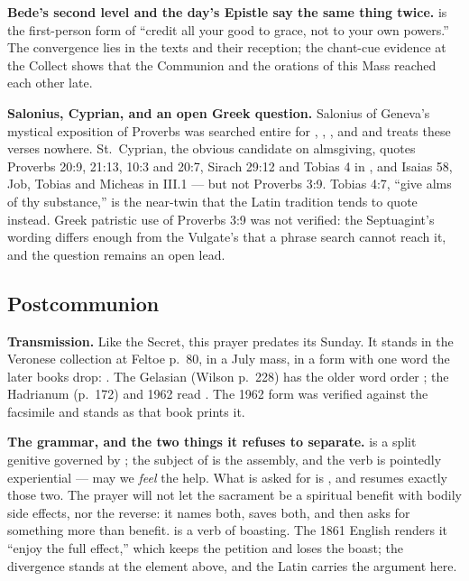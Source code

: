 \textbf{Bede's second level and the day's Epistle say the same thing twice.}
 is the first-person form of ``credit
all your good to grace, not to your own powers.'' The convergence lies in the
texts and their reception; the chant-cue evidence at the Collect shows that
the Communion and the orations of this Mass reached each other late.

\textbf{Salonius, Cyprian, and an open Greek question.} Salonius of Geneva's mystical
exposition of Proverbs was searched entire for ,
, ,  and  and
treats these verses nowhere. St.~Cyprian, the obvious candidate on almsgiving,
quotes Proverbs 20:9, 21:13, 10:3 and 20:7, Sirach 29:12 and Tobias 4 in
, and Isaias 58, Job, Tobias and Micheas in
 III.1 --- but not Proverbs 3:9. Tobias 4:7, ``give alms of
thy substance,'' is the near-twin that the Latin tradition tends to quote
instead. Greek patristic use of Proverbs 3:9 was not verified: the Septuagint's
wording differs enough from the Vulgate's that a phrase search cannot reach it,
and the question remains an open lead.

\elementguard
\subsection*{Postcommunion }


\textbf{Transmission.} Like the Secret, this prayer predates its Sunday. It
stands in the Veronese collection at Feltoe p.~80, in a July mass, in a form
with one word the later books drop: . The Gelasian (Wilson p.~228) has the
older word order ; the Hadrianum
(p.~172) and 1962 read . The 1962 form was verified
against the facsimile and stands as that book prints it.

\textbf{The grammar, and the two things it refuses to separate.}
 is a split genitive governed by
; the subject of  is the assembly, and the
verb is pointedly experiential --- may we \textit{feel} the help. What is
asked for is , and 
resumes exactly those two. The prayer will not let the sacrament be a
spiritual benefit with bodily side effects, nor the reverse: it names both,
saves both, and then asks for something more than benefit.  is
a verb of boasting. The 1861 English renders it ``enjoy the full effect,''
which keeps the petition and loses the boast; the divergence stands at the
element above, and the Latin carries the argument here.

